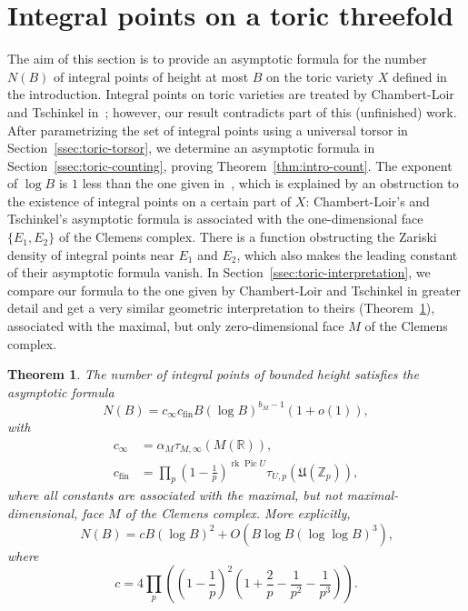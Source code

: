\documentclass[a4paper, twoside, 10pt]{amsart}
\newcommand{\mU}{\mathfrak{U}}
\newcommand{\RR}{\mathbb{R}}
\newcommand{\ZZ}{\mathbb{Z}}
\DeclareMathOperator{\Pic}{Pic}
\DeclareMathOperator{\rk}{rk}
\newcommand{\fin}{\mathrm{fin}}
\newtheorem{theorem}{Theorem}[subsection]
\theoremstyle{definition}
\begin{document}
\section{Integral points on a toric threefold}\label{sec:toric}


The aim of this section is to provide an asymptotic formula for the number $N(B)$ of integral points of height at most $B$ on the toric variety $X$ defined in the introduction. Integral points on toric varieties are treated by Chambert-Loir and Tschinkel in~\cite{arXiv:1006.3345}; however, our result contradicts part of this (unfinished) work.
After parametrizing the set of integral points using a universal torsor in Section~\ref{ssec:toric-torsor}, we determine an asymptotic formula in Section~\ref{ssec:toric-counting}, proving Theorem~\ref{thm:intro-count}. The exponent of $\log B$ is $1$ less than the one given in~\cite{arXiv:1006.3345}, which is explained by an obstruction to the existence of integral points on a certain part of $X$: Chambert-Loir's and Tschinkel's asymptotic formula is associated with the one-dimensional face $\{E_1,E_2\}$ of the Clemens complex. There is a function obstructing the Zariski density of integral points near $E_1$ and $E_2$, which also makes the leading constant of their asymptotic formula vanish.
In Section~\ref{ssec:toric-interpretation}, we compare our formula to the one given by Chambert-Loir and Tschinkel in greater detail and get a very similar geometric interpretation to theirs (Theorem~\ref{thm:interpreted-count}), associated with the maximal, but only zero-dimensional face $M$ of the Clemens complex.
\begin{theorem}\label{thm:interpreted-count}
  The number of integral points of bounded height satisfies the asymptotic formula
  \[
    N(B) = c_{\infty} c_{\fin}B (\log B)^{b_M-1} (1+o(1)),
  \]
  with
  \begin{align*}
    c_{\infty} &=\alpha_M \tau_{M,\infty}(M(\RR)),\\
    c_{\fin} &= \prod_p \left(1-\frac{1}{p}\right)^{\rk\Pic U} \tau_{U,p}(\mU(\ZZ_p)),
  \end{align*}
  where all constants are associated with the maximal, but not maximal-dimensional, face $M$ of the Clemens complex.
  More explicitly,
  \[
    N(B)=c B (\log B)^2 + O(B\log B(\log\log B)^3)\text{,}
  \]
  where
  \[
    c=4 \prod_p \left(\left(1-\frac{1}{p}\right)^2\left(1+\frac{2}{p}-\frac{1}{p^2}-\frac{1}{p^3}\right)\right) \text{.}
  \]
\end{theorem}
\end{document}
